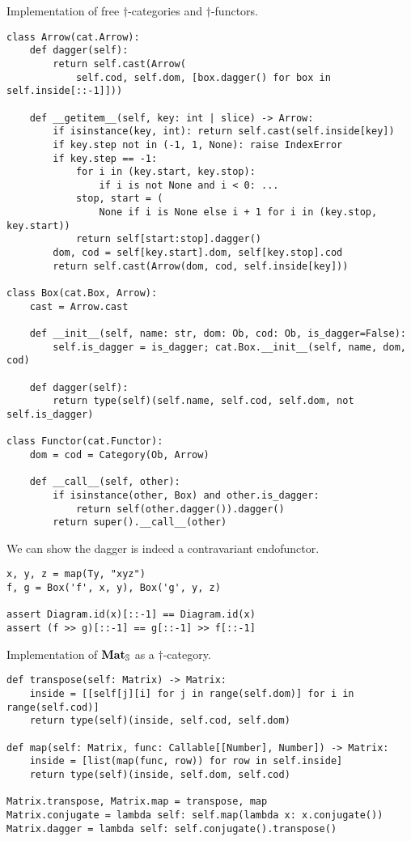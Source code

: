 \begin{python}
{\normalfont Implementation of free $\dagger$-categories and $\dagger$-functors.}
\begin{verbatim}
class Arrow(cat.Arrow):
    def dagger(self):
        return self.cast(Arrow(
            self.cod, self.dom, [box.dagger() for box in self.inside[::-1]]))

    def __getitem__(self, key: int | slice) -> Arrow:
        if isinstance(key, int): return self.cast(self.inside[key])
        if key.step not in (-1, 1, None): raise IndexError
        if key.step == -1:
            for i in (key.start, key.stop):
                if i is not None and i < 0: ...
            stop, start = (
                None if i is None else i + 1 for i in (key.stop, key.start))
            return self[start:stop].dagger()
        dom, cod = self[key.start].dom, self[key.stop].cod
        return self.cast(Arrow(dom, cod, self.inside[key]))

class Box(cat.Box, Arrow):
    cast = Arrow.cast

    def __init__(self, name: str, dom: Ob, cod: Ob, is_dagger=False):
        self.is_dagger = is_dagger; cat.Box.__init__(self, name, dom, cod)

    def dagger(self):
        return type(self)(self.name, self.cod, self.dom, not self.is_dagger)

class Functor(cat.Functor):
    dom = cod = Category(Ob, Arrow)

    def __call__(self, other):
        if isinstance(other, Box) and other.is_dagger:
            return self(other.dagger()).dagger()
        return super().__call__(other)
\end{verbatim}
\end{python}

\begin{example}
We can show the dagger is indeed a contravariant endofunctor.

\begin{verbatim}
x, y, z = map(Ty, "xyz")
f, g = Box('f', x, y), Box('g', y, z)

assert Diagram.id(x)[::-1] == Diagram.id(x)
assert (f >> g)[::-1] == g[::-1] >> f[::-1]
\end{verbatim}
\end{example}

\begin{python}
{\normalfont Implementation of $\mathbf{Mat}_\S$ as a $\dagger$-category.}

\begin{verbatim}
def transpose(self: Matrix) -> Matrix:
    inside = [[self[j][i] for j in range(self.dom)] for i in range(self.cod)]
    return type(self)(inside, self.cod, self.dom)

def map(self: Matrix, func: Callable[[Number], Number]) -> Matrix:
    inside = [list(map(func, row)) for row in self.inside]
    return type(self)(inside, self.dom, self.cod)

Matrix.transpose, Matrix.map = transpose, map
Matrix.conjugate = lambda self: self.map(lambda x: x.conjugate())
Matrix.dagger = lambda self: self.conjugate().transpose()
\end{verbatim}
\end{python}

